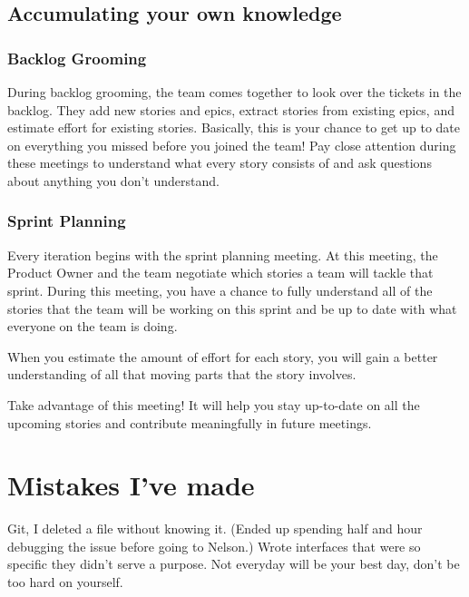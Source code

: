 \documentclass[oneside]{book}
\begin{document}
\section{Accumulating your own knowledge}
\subsection{Backlog Grooming}
During backlog grooming, the team comes together to look over the tickets in the backlog. They add new stories and epics, extract stories from existing epics, and estimate effort for existing stories. Basically, this is your chance to get up to date on everything you missed before you joined the team! Pay close attention during these meetings to understand what every story consists of and ask questions about anything you don't understand.
\subsection{Sprint Planning}
Every iteration begins with the sprint planning meeting. At this meeting, the Product Owner and the team negotiate which stories a team will tackle that sprint. During this meeting, you have a chance to fully understand all of the stories that the team will be working on this sprint and be up to date with what everyone on the team is doing. \par
When you estimate the amount of effort for each story, you will gain a better understanding of all that moving parts that the story involves. 

Take advantage of this meeting! It will help you stay up-to-date on all the upcoming stories and contribute meaningfully in future meetings.
\chapter{Mistakes I've made}
Git, I deleted a file without knowing it. (Ended up spending half and hour debugging the issue before going to Nelson.)
Wrote interfaces that were so specific they didn't serve a purpose.
Not everyday will be your best day, don't be too hard on yourself.
\end{document}
